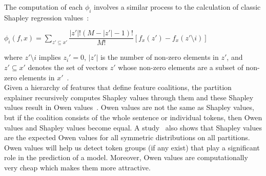 The computation of each $\phi_i$ involves a similar process to the calculation of classic Shapley regression values~\parencite{AnalysisOfRegressionInGameTheory_Lipovetsky}:
\begin{center}
    $\phi_i(f, x ) = \sum\limits_{z' \subseteq x'} \dfrac{|z'|! (M - |z'| - 1)!}{M!} [f_x(z') - f_x(z' \setminus i)]$
\end{center}
where $z' \setminus i$ implies $z_i' = 0$, $|z'|$ is the number of non-zero elements in $z'$, and $z' \subseteq x'$ denotes the set of vectors $z'$ whose non-zero elements are a subset of non-zero elements in $x'$~\parencite{AUnifiedApproach_Lundberg}.\\
Given a hierarchy of features that define feature coalitions, the partition explainer recursively computes Shapley values through them and these Shapley values result in Owen values~\parencite{OwenValues_Owen}. Owen values are not the same as Shapley values, but if the coalition consists of the whole sentence or individual tokens, then Owen values and Shapley values become equal. A study~\parencite{TheOwenAndShapleyValue_Casajus} also shows that Shapley values are the expected Owen values for all symmetric distributions on all partitions. Owen values will help us detect token groups (if any exist) that play a significant role in the prediction of a model. Moreover, Owen values are computationally very cheap which makes them more attractive.\\
